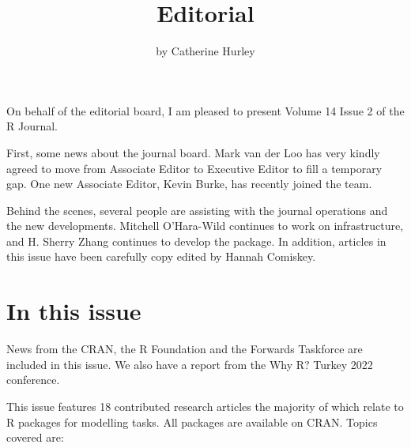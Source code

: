 \title{Editorial}
\author{by Catherine Hurley}

\maketitle


On behalf of the editorial board, I am pleased to present Volume 14
Issue 2 of the R Journal.

First, some news about the journal board. Mark van der Loo has very
kindly agreed to move from Associate Editor to Executive Editor to fill
a temporary gap. One new Associate Editor, Kevin Burke, has recently
joined the team.

Behind the scenes, several people are assisting with the journal
operations and the new developments. Mitchell O'Hara-Wild continues to
work on infrastructure, and H. Sherry Zhang continues to develop the
 package. In addition, articles in this issue have been
carefully copy edited by Hannah Comiskey.

\hypertarget{in-this-issue}{%
\section{In this issue}\label{in-this-issue}}

News from the CRAN, the R Foundation and the Forwards Taskforce are
included in this issue. We also have a report from the Why R? Turkey
2022 conference.

This issue features 18 contributed research articles the majority of
which relate to R packages for modelling tasks. All packages are
available on CRAN. Topics covered are:

